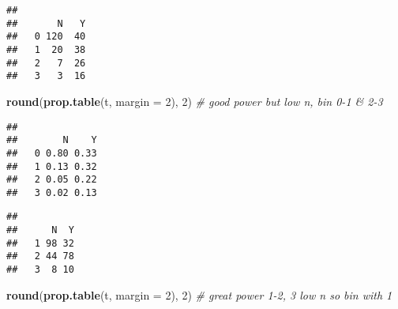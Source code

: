 \documentclass[
]{article}
\newenvironment{Shaded}{\begin{snugshade}}{\end{snugshade}}
\newcommand{\AttributeTok}[1]{\textcolor[rgb]{0.13,0.29,0.53}{#1}}
\newcommand{\CommentTok}[1]{\textcolor[rgb]{0.56,0.35,0.01}{\textit{#1}}}
\newcommand{\DecValTok}[1]{\textcolor[rgb]{0.00,0.00,0.81}{#1}}
\newcommand{\FunctionTok}[1]{\textcolor[rgb]{0.13,0.29,0.53}{\textbf{#1}}}
\newcommand{\NormalTok}[1]{#1}
\newcommand{\OtherTok}[1]{\textcolor[rgb]{0.56,0.35,0.01}{#1}}
\newcommand{\SpecialCharTok}[1]{\textcolor[rgb]{0.81,0.36,0.00}{\textbf{#1}}}
\newcommand{\StringTok}[1]{\textcolor[rgb]{0.31,0.60,0.02}{#1}}
\begin{document}
\begin{verbatim}
##    
##       N   Y
##   0 120  40
##   1  20  38
##   2   7  26
##   3   3  16
\end{verbatim}

\begin{Shaded}
\begin{Highlighting}[]
\FunctionTok{round}\NormalTok{(}\FunctionTok{prop.table}\NormalTok{(t, }\AttributeTok{margin =} \DecValTok{2}\NormalTok{), }\DecValTok{2}\NormalTok{) }\CommentTok{\# good power but low n, bin 0{-}1 \& 2{-}3}
\end{Highlighting}
\end{Shaded}

\begin{verbatim}
##    
##        N    Y
##   0 0.80 0.33
##   1 0.13 0.32
##   2 0.05 0.22
##   3 0.02 0.13
\end{verbatim}

\begin{Shaded}
\end{Shaded}

\begin{verbatim}
##    
##      N  Y
##   1 98 32
##   2 44 78
##   3  8 10
\end{verbatim}

\begin{Shaded}
\begin{Highlighting}[]
\FunctionTok{round}\NormalTok{(}\FunctionTok{prop.table}\NormalTok{(t, }\AttributeTok{margin =} \DecValTok{2}\NormalTok{), }\DecValTok{2}\NormalTok{) }\CommentTok{\# great power 1{-}2, 3 low n so bin with 1}
\end{Highlighting}
\end{Shaded}
\end{document}
